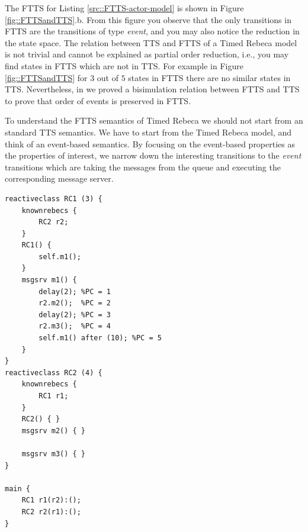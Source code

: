 The FTTS for Listing \ref{src::FTTS-actor-model} is shown in Figure \ref{fig::FTTSandTTS}.b. From this figure you observe that the only transitions in FTTS are the transitions of type \textit{event}, and you may also notice the reduction in the state space.
%
The relation between TTS and FTTS of a Timed Rebeca model is not trivial and cannot be explained as partial order reduction, i.e., you may find states in FTTS which are not in TTS.
For example in Figure \ref{fig::FTTSandTTS} for $3$ out of $5$ states in FTTS there are no similar states in TTS. Nevertheless, in \cite{FACSFTTS} we proved a bisimulation relation between FTTS and TTS to prove that order of events is preserved in FTTS.

To understand the FTTS semantics of Timed Rebeca we should not start from an standard TTS semantics. We have to start from the Timed Rebeca model, and think of an event-based semantics. By focusing on the event-based properties as the properties of interest, we narrow down the interesting transitions to the \textit{event} transitions which are taking the messages from the queue and executing the corresponding message server.

\begin{lstlisting}[language=rebeca, caption= A simple Timed Rebeca model with two rebecs, label=src::FTTS-actor-model]
reactiveclass RC1 (3) {
	knownrebecs {
		RC2 r2;
	}
	RC1() {
		self.m1();
	}
	msgsrv m1() {
		delay(2); %PC = 1
		r2.m2();  %PC = 2 
		delay(2); %PC = 3 
		r2.m3();  %PC = 4
		self.m1() after (10); %PC = 5
	}
}
reactiveclass RC2 (4) {
	knownrebecs {
		RC1 r1;
	}
	RC2() { }
	msgsrv m2() { }
	
	msgsrv m3() { }
}

main {
	RC1 r1(r2):();
	RC2 r2(r1):();
}

\end{lstlisting}

